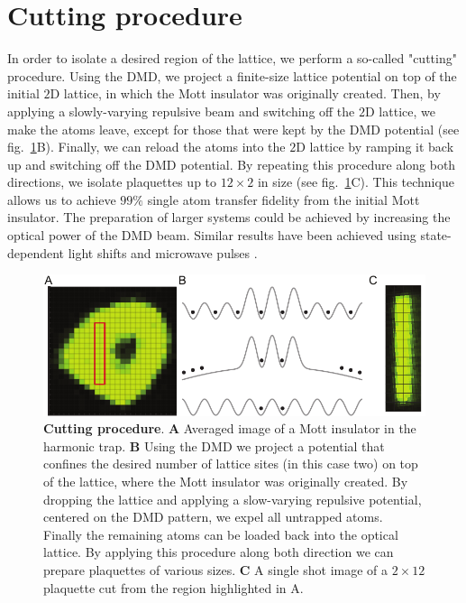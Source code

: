 \section{Cutting procedure}

In order to isolate a desired region of the lattice, we perform a so-called "cutting" procedure. Using the DMD, we project a finite-size lattice potential on top of the initial $2\mathrm{D}$ lattice, in which the Mott insulator was originally created. Then, by applying a slowly-varying repulsive beam and switching off the $2\mathrm{D}$ lattice, we make the atoms leave, except for those that were kept by the DMD potential (see fig.~\ref{fig:CTE_cutting}B). Finally, we can reload the atoms into the $2\mathrm{D}$ lattice by ramping it back up and switching off the DMD potential. By repeating this procedure along both directions, we isolate plaquettes up to $12\times2$ in size (see fig.~\ref{fig:CTE_cutting}C). This technique allows us to achieve $99\%$ single atom transfer fidelity from the initial Mott insulator. The preparation of larger systems could be achieved by increasing the optical power of the DMD beam. Similar results have been achieved using state-dependent light shifts and microwave pulses \cite{Weitenberg2011}.

\begin{figure}[t]
	\centering
	\includegraphics[scale=1]{figures/CTE_cutting.pdf}
	\caption{{\bf Cutting procedure}. {\bf A} Averaged image of a Mott insulator in the harmonic trap. {\bf B} Using the DMD we project a potential that confines the desired number of lattice sites (in this case two) on top of the lattice, where the Mott insulator was originally created. By dropping the lattice and applying a slow-varying repulsive potential, centered on the DMD pattern, we expel all untrapped atoms. Finally the remaining atoms can be loaded back into the optical lattice. By applying this procedure along both direction we can prepare plaquettes of various sizes. {\bf C} A single shot image of a $2 \times 12$ plaquette cut from the region highlighted in A.}
	\label{fig:CTE_cutting}
\end{figure}

